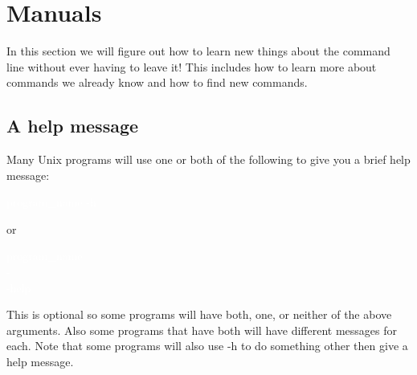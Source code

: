\documentclass[oneside]{book}
\newcommand{\commandline}[1]{\begin{center} \colorbox{Dark}{\textcolor{white}{#1}} \end{center}}
\newtheorem{ex}{Exercise}[chapter]
\begin{document}

\section{Manuals}
In this section we will figure out how to learn new things about the command line without ever having to leave it! This includes how to learn more about commands we already know and how to find new commands.
\subsection{ A help message}
Many Unix programs will use one or both of the following to give you a brief help message:
\commandline{program\_name -h}
or
\commandline{program\_name \ \\-\\-help}
This is optional so some programs will have both, one, or neither of the above arguments. Also some programs that have both will have different messages for each. Note that some programs will also use -h to do something other then give a help message.
\end{document}
